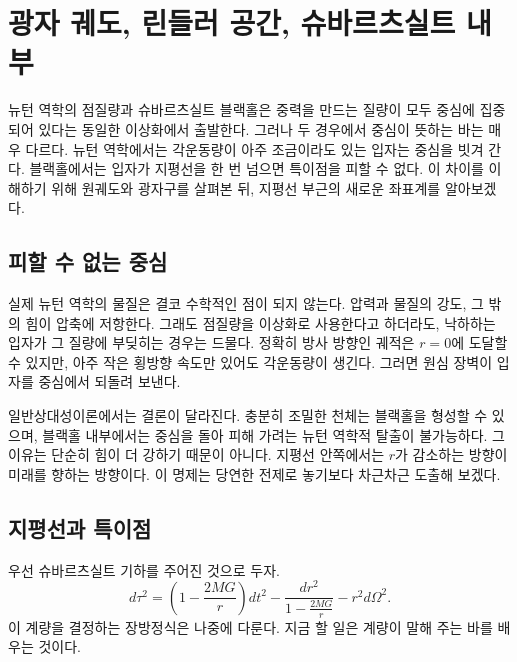 \chapter{광자 궤도, 린들러 공간, 슈바르츠실트 내부}

뉴턴 역학의 점질량과 슈바르츠실트 블랙홀은 중력을 만드는 질량이 모두 중심에 집중되어 있다는 동일한 이상화에서 출발한다. 그러나 두 경우에서 중심이 뜻하는 바는 매우 다르다. 뉴턴 역학에서는 각운동량이 아주 조금이라도 있는 입자는 중심을 빗겨 간다. 블랙홀에서는 입자가 지평선을 한 번 넘으면 특이점을 피할 수 없다. 이 차이를 이해하기 위해 원궤도와 광자구를 살펴본 뒤, 지평선 부근의 새로운 좌표계를 알아보겠다.

\section{피할 수 없는 중심}

실제 뉴턴 역학의 물질은 결코 수학적인 점이 되지 않는다. 압력과 물질의 강도, 그 밖의 힘이 압축에 저항한다. 그래도 점질량을 이상화로 사용한다고 하더라도, 낙하하는 입자가 그 질량에 부딪히는 경우는 드물다. 정확히 방사 방향인 궤적은 \(r=0\)에 도달할 수 있지만, 아주 작은 횡방향 속도만 있어도 각운동량이 생긴다. 그러면 원심 장벽이 입자를 중심에서 되돌려 보낸다.

일반상대성이론에서는 결론이 달라진다. 충분히 조밀한 천체는 블랙홀을 형성할 수 있으며, 블랙홀 내부에서는 중심을 돌아 피해 가려는 뉴턴 역학적 탈출이 불가능하다. 그 이유는 단순히 힘이 더 강하기 때문이 아니다. 지평선 안쪽에서는 \(r\)가 감소하는 방향이 미래를 향하는 방향이다. 이 명제는 당연한 전제로 놓기보다 차근차근 도출해 보겠다.

\begin{classroomqa}
\end{classroomqa}

\section{지평선과 특이점}

우선 슈바르츠실트 기하를 주어진 것으로 두자.
\begin{equation}
d\tau^{2}
=
\left(1-\frac{2MG}{r}\right)dt^{2}
-
\frac{dr^{2}}{1-\frac{2MG}{r}}
-
r^{2}d\Omega^{2}.
\label{eq:l6-schwarzschild}
\end{equation}
이 계량을 결정하는 장방정식은 나중에 다룬다. 지금 할 일은 계량이 말해 주는 바를 배우는 것이다.

